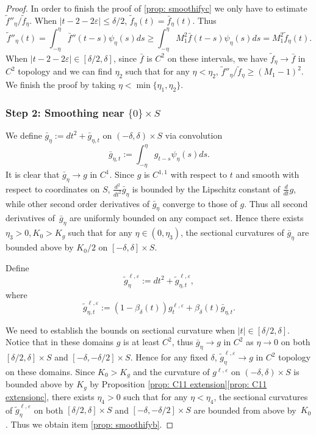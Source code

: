\documentclass[JEP,XML,SOM,Unicode,NoFloatCountersInSection]{cedram}
\theoremstyle{definition}
\let\eps\varepsilon
\renewcommand{\>}{{\rangle}}
\newcommand{\<}{{\langle}}
\begin{document}
\begin{proof}
In order to finish the proof of \eqref{prop: smoothifyc} we only have to estimate $\tilde{f}''_{\eta}/\tilde{f}_{\eta}$. When $|t-2-2\eps|\leq \delta/2$, $\tilde{f}_{\eta}(t)=\bar{f}_{\eta}(t)$. Thus
\[
\tilde{f}''_{\eta}(t)=\int_{-\eta}^{\eta}\bar{f}''(t-s)\psi_{\eta}(s)ds
\geq \int_{-\eta}^{\eta}M_1^2\bar{f}(t-s)\psi_{\eta}(s)ds=M_1^2\tilde{f}_{\eta}(t).
\]
When $|t-2-2\eps|\in [\delta/2,\delta]$, since $\bar{f}$ is $C^2$ on these intervals, we have $\tilde{f}_{\eta}\to \bar{f}$ in $C^2$ topology and we can find $\eta_2$ such that for any $\eta<\eta_2$, $\tilde{f}''_{\eta}/\tilde{f}_{\eta}\geq (M_1-1)^2$. We finish the proof by taking $\eta<\min\{\eta_1, \eta_2\}$.

\subsubsection*{Step 2: Smoothing near $\{0\}\times S$}
We define $\bar{g}_{\eta}:=dt^2+\bar{g}_{\eta,t}$ on $(-\delta,\delta)\times S$ via convolution
\[
\bar{g}_{\eta,t}:=\int_{-\eta}^{\eta}g_{t-s}\psi_\eta(s)ds.
\]
It is clear that $\bar{g}_{\eta}\to g$ in $C^1$. Since $g$ is $C^{1,1}$ with respect to $t$ and smooth with respect to coordinates on $S$, $\frac{d^2}{dt^2}\bar{g}_{\eta}$ is bounded by the Lipschitz constant of $\frac{d}{dt}g$, while other second order derivatives of $\bar{g}_{\eta}$ converge to those of $g$. Thus all second derivatives of~$\bar{g}_{\eta}$ are uniformly bounded on any compact set. Hence there exists $\eta_3>0, K_0>K_g$ such that for any $\eta\in (0,\eta_3)$, the sectional curvatures of $\bar{g}_{\eta}$ are bounded above by $K_0/2$ on $[-\delta,\delta]\times S$.

Define
\[
\tilde{g}^{\ell,\eps}_{\eta}:=dt^2+\tilde{g}^{\ell,\eps}_{\eta,t},
\]
where
\[
\tilde{g}^{\ell,\eps}_{\eta,t}:=(1-\beta_\delta(t))g^{\ell,\eps}_t+\beta_\delta(t)\bar{g}^{}_{\eta,t}.
\]

We need to establish the bounds on sectional curvature when $|t|\in [\delta/2,\delta]$. Notice that in these domains $g$ is at least $C^2$, thus $\bar{g}^{}_{\eta}\to g$ in $C^2$ as $\eta\to 0$ on both $[\delta/2, \delta]\times S$ and $ [-\delta, -\delta/2]\times S$.
Hence for any fixed $\delta$, $\tilde{g}^{\ell,\eps}_{\eta}\to g$ in $C^2$ topology on these domains. Since $K_0>K_g$ and the curvature of $g^{\ell,\eps}$ on $(-\delta, \delta)\times S$ is bounded above by $K_g$ by Proposition \ref{prop: C11 extension}\eqref{prop: C11 extensionc}, there exists $\eta_4>0$ such that for any $\eta<\eta_4$, the sectional curvatures of $\tilde{g}^{\ell,\eps}_{\eta}$ on both $[\delta/2, \delta]\times S$ and $ [-\delta, -\delta/2]\times S$ are bounded from above by~$K_0$. Thus we obtain item \eqref{prop: smoothifyb}.


\end{proof}
\end{document}
